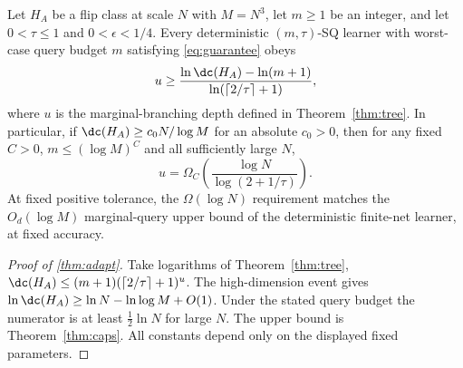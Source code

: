\begin{theorem}\label{thm:adapt}
Let $H_A$ be a flip class at scale $N$ with $M=N^3$, let $m\ge1$ be an integer, and let $0<\tau\le1$ and $0<\epsilon<1/4$. Every deterministic $(m,\tau)$-SQ learner with worst-case query budget $m$ satisfying \eqref{eq:guarantee} obeys
\[
 u\ge\frac{\ln\dc(H_A)-\ln(m+1)}
 {\ln(\lceil2/\tau\rceil+1)},
\]
where $u$ is the marginal-branching depth defined in Theorem~\ref{thm:tree}. In particular, if $\dc(H_A)\ge c_0N/\log M$ for an absolute $c_0>0$, then for any fixed $C>0$, $m\le(\log M)^C$ and all sufficiently large $N$,
\[
 u=\Omega_C\!\left(\frac{\log N}{\log(2+1/\tau)}\right).
\]
At fixed positive tolerance, the $\Omega(\log N)$ requirement matches the $O_d(\log M)$ marginal-query upper bound of the deterministic finite-net learner, at fixed accuracy.
\end{theorem}

\begin{proof}[Proof of \cref{thm:adapt}]
Take logarithms of Theorem~\ref{thm:tree}, $\dc(H_A)\le(m+1)(\lceil2/\tau\rceil+1)^u$. The high-dimension event gives $\ln\dc(H_A)\ge\ln N-\ln\log M+O(1)$. Under the stated query budget the numerator is at least $\tfrac12\ln N$ for large $N$. The upper bound is Theorem~\ref{thm:caps}. All constants depend only on the displayed fixed parameters.
\end{proof}
